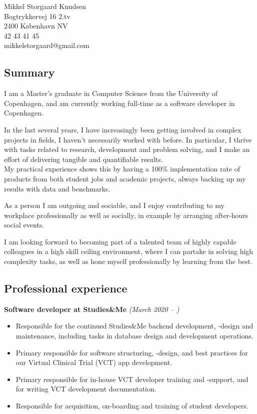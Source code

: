 \documentclass[10pt, a4paper]{article}
\begin{document}
Mikkel Storgaard Knudsen \\
Bogtrykkervej 16 2.tv \\
2400 København NV \\
42 43 41 45 \\
mikkelstorgaard@gmail.com

\subsection*{Summary}
I am a Master's graduate in Computer Science from the University of Copenhagen,
and am currently working full-time as a software developer in Copenhagen.

In the last several years, I have increasingly been getting involved in complex
projects in fields, I haven't necessarily worked with before. In particular, I thrive with tasks related to
research, development and problem solving, and I make an effort of delivering
tangible and quantifiable results.\\
My practical experience shows this by having a 100\% implementation rate of products
from both student jobs and academic projects, always backing up my results with
data and benchmarks.

As a person I am outgoing and sociable, and I enjoy contributing to my
workplace professionally as well as socially, in example by arranging after-hours social
events.

I am looking forward to becoming part of a talented team of highly capable
colleagues in a high skill ceiling environment, where I can partake in solving high
complexity tasks, as well as hone myself professionally by learning from the
best.

\subsection*{Professional experience}
\textbf{Software developer at Studies\&Me} \textit{(March 2020 -- )}
\begin{itemize}[topsep=0pt]
\item Responsible for the continued Studies\&Me backend development, -design and maintenance, including tasks in database design and development operations.

\item Primary responsible for software structuring, -design, and best practices for our Virtual Clinical Trial (VCT) app development.

\item Primary responsible for in-house VCT developer training and -support, and for writing VCT development documentation.

\item Responsible for acquisition, on-boarding and training of student developers.
\end{itemize}
\end{document}
